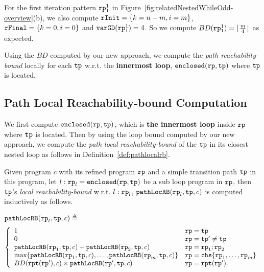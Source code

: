 For the first iteration pattern $\mathtt{rp}_1^1$ in Figure~\ref{fig:relatedNestedWhileOdd-overview}(b), we also compute 
$\mathtt{rInit} = \{k = n - m, i = m\}$, $\mathtt{rFinal} = \{k = 0, i = 0\}$ and $\mathtt{varGD}(\mathtt{rp}_1^1) = 4$. So we compute $BD(\mathtt{rp}_1^1) = \lfloor \frac{m}{4} \rfloor $ as expected.

Using the $BD$ computed by our new approach, we compute the \emph{path reachability-bound} locally for
each $\mathtt{tp}$ w.r.t. the \textbf{innermost loop}, $\mathtt{enclosed}(\mathtt{rp}, \mathtt{tp})$ where $\mathtt{tp}$ is located.

\subsection{Path Local Reachability-bound Computation}
We first compute $\mathtt{enclosed}(\mathtt{rp}, \mathtt{tp})$, which is \textbf{the innermost loop} inside $\mathtt{rp}$ where $\mathtt{tp}$ is located. Then by using the loop bound computed by our new approach, we compute the \emph{path local reachability-bound} of
the $\mathtt{tp}$ in its closest nested loop as follows in Definition~\ref{def:pathlocalrb}.
\begin{defn}
    \label{def:pathlocalrb}
    Given program $c$ with its refined program $\mathtt{rp}$ and a simple transition path $\mathtt{tp}$ in this program, 
    let $l: \mathtt{rp}_l = \mathtt{enclosed}(\mathtt{rp}, \mathtt{tp})$ be a sub loop program in $\mathtt{rp}$,
    then $\mathtt{tp}$'s \emph{local reachability-bound} w.r.t. $l: \mathtt{rp}_l$,
    $\mathtt{pathLocRB}(\mathtt{rp}_l, \mathtt{tp}, c)$
    is computed inductively as follows.

    $\mathtt{pathLocRB}(\mathtt{rp}_l, \mathtt{tp}, c) \triangleq$
    \[ 
      \left\{
    \begin{array}{ll}
       1  & \rprog = \tpath\\
      {0} & \rprog = \tpath' \neq \tpath\\
      \outinB(\rprog_1, \tpath, c) + \outinB(\rprog_2, \tpath, c) & \rprog = \rprog_1;\rprog_2 \\
      \max\left\{ \outinB(\rprog_1, \tpath, c), \ldots, \outinB(\rprog_m, \tpath, c) \right\} 
      & \rprog = \rpchoose{\rprog_1, \ldots, \rprog_m } \\
      BD(\rprepeat(\rprog'), c) \times \outinB(\rprog', \tpath, c) & \rprog = \rprepeat(\rprog').
    \end{array}
    \right.
    \]
\end{defn}
